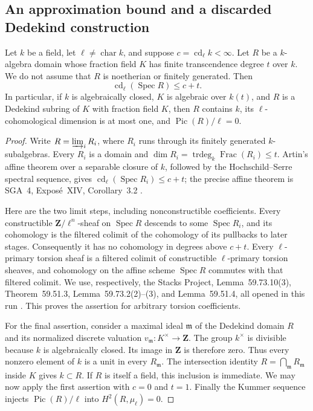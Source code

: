 \subsection{An approximation bound and a discarded Dedekind construction}

\begin{lemma}
\label{A:A2-approximation}
Let $k$ be a field, let $\ell\ne\operatorname{char}k$, and suppose
$c=\operatorname{cd}_{\ell}k<\infty$.  Let $R$ be a $k$-algebra domain
whose fraction field $K$ has finite transcendence degree $t$ over $k$.
We do not assume that $R$ is noetherian or finitely generated.  Then
\[
\operatorname{cd}_{\ell}(\operatorname{Spec}R)\le c+t.
\]
In particular, if $k$ is algebraically closed, $K$ is algebraic over
$k(t)$, and $R$ is a Dedekind subring of $K$ with fraction field $K$,
then $R$ contains $k$, its $\ell$-cohomological dimension is at most
one, and $\operatorname{Pic}(R)/\ell=0$.
\end{lemma}

\begin{proof}
Write $R=\varinjlim_i R_i$, where $R_i$ runs through its finitely
generated $k$-subalgebras.  Every $R_i$ is a domain and
$\dim R_i=\operatorname{trdeg}_k\operatorname{Frac}(R_i)\le t$.
Artin's affine theorem over a separable closure of $k$, followed by
the Hochschild--Serre spectral sequence, gives
$\operatorname{cd}_{\ell}(\operatorname{Spec}R_i)\le c+t$; the
precise affine theorem is SGA~4, Expos\'e~XIV, Corollary~3.2
\cite{C_SGA4}.

Here are the two limit steps, including nonconstructible coefficients.
Every constructible $\mathbf Z/\ell^n$-sheaf on
$\operatorname{Spec}R$ descends to some $\operatorname{Spec}R_i$,
and its cohomology is the filtered colimit of the cohomology of its
pullbacks to later stages.  Consequently it has no cohomology in
degrees above $c+t$.  Every $\ell$-primary torsion sheaf is a filtered
colimit of constructible $\ell$-primary torsion sheaves, and cohomology
on the affine scheme $\operatorname{Spec}R$ commutes with that
filtered colimit.  We use, respectively, the Stacks Project,
Lemma~59.73.10(3), Theorem~59.51.3, Lemma~59.73.2(2)--(3), and
Lemma~59.51.4, all opened in this run \cite{C_StacksLimits}.
This proves the assertion for arbitrary torsion coefficients.

For the final assertion, consider a maximal ideal $\mathfrak m$ of
the Dedekind domain $R$ and its normalized discrete valuation
$v_{\mathfrak m}\colon K^\times\to\mathbf Z$.  The group $k^\times$
is divisible because $k$ is algebraically closed.  Its image in
$\mathbf Z$ is therefore zero.  Thus every nonzero element of $k$
is a unit in every $R_{\mathfrak m}$.  The intersection identity
$R=\bigcap_{\mathfrak m}R_{\mathfrak m}$ inside $K$ gives $k\subset R$.
If $R$ is itself a field, this inclusion is immediate.  We may now
apply the first assertion with $c=0$ and $t=1$.  Finally the Kummer
sequence injects $\operatorname{Pic}(R)/\ell$ into
$H^2(R,\mu_\ell)=0$.
\end{proof}

